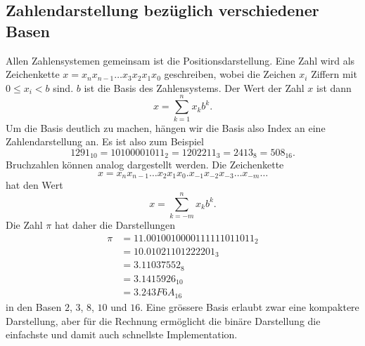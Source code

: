\subsection{Zahlendarstellung bezüglich verschiedener Basen
\label{buch:subsection:basen}}
Allen Zahlensystemen gemeinsam ist die Positionsdarstellung.
Eine Zahl wird als Zeichenkette $x=x_nx_{n-1}\dots x_3x_2x_1x_0$
geschreiben,
wobei die Zeichen $x_i$ Ziffern mit $0 \le x_i < b$ sind.
$b$ ist die Basis des Zahlensystems.
Der Wert der Zahl $x$ ist dann 
\[
x
=
\sum_{k=1}^n x_kb^k.
\]
Um die Basis deutlich zu machen, 
hängen wir die Basis also Index an eine Zahlendarstellung an.
Es ist also zum Beispiel
\[
1291_{10}
=
10100001011_2
=
1202211_3
=
2413_8
=
508_{16}.
\]
Bruchzahlen können analog dargestellt werden.
Die Zeichenkette
\[
x = x_{n}x_{n-1}\dots x_2x_1x_0\texttt{.}x_{-1}x_{-2}x_{-3}\dots x_{-m}\dots
\]
hat den Wert
\[
x = \sum_{k=-m}^n x_kb^k.
\]
Die Zahl $\pi$ hat daher die Darstellungen
\begin{align*}
\pi
&=
11.0010010000111111011011_2
\\
&=
10.01021101222201_3
\\
&=
3.11037552_8
\\
&=
3.1415926_{10}
\\
&=
3.243F6A_{16}
\end{align*}
in den Basen $2$, $3$, $8$, $10$ und $16$.
Eine grössere Basis erlaubt zwar eine kompaktere Darstellung, aber
für die Rechnung ermöglicht die binäre Darstellung die einfachste
und damit auch schnellste Implementation.

